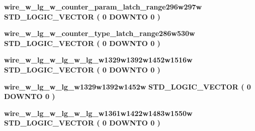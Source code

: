 \begin{DoxyCompactItemize}
{\bf wire\+\_\+w\+\_\+lg\+\_\+w\+\_\+counter\+\_\+param\+\_\+latch\+\_\+range296w297w} {\bfseries \textcolor{comment}{S\+T\+D\+\_\+\+L\+O\+G\+I\+C\+\_\+\+V\+E\+C\+T\+OR}\textcolor{vhdlchar}{ }\textcolor{vhdlchar}{(}\textcolor{vhdlchar}{ }\textcolor{vhdlchar}{ } \textcolor{vhdldigit}{0} \textcolor{vhdlchar}{ }\textcolor{keywordflow}{D\+O\+W\+N\+TO}\textcolor{vhdlchar}{ }\textcolor{vhdlchar}{ } \textcolor{vhdldigit}{0} \textcolor{vhdlchar}{ }\textcolor{vhdlchar}{)}\textcolor{vhdlchar}{ }} 
\item 
{\bf wire\+\_\+w\+\_\+lg\+\_\+w\+\_\+counter\+\_\+type\+\_\+latch\+\_\+range286w530w} {\bfseries \textcolor{comment}{S\+T\+D\+\_\+\+L\+O\+G\+I\+C\+\_\+\+V\+E\+C\+T\+OR}\textcolor{vhdlchar}{ }\textcolor{vhdlchar}{(}\textcolor{vhdlchar}{ }\textcolor{vhdlchar}{ } \textcolor{vhdldigit}{0} \textcolor{vhdlchar}{ }\textcolor{keywordflow}{D\+O\+W\+N\+TO}\textcolor{vhdlchar}{ }\textcolor{vhdlchar}{ } \textcolor{vhdldigit}{0} \textcolor{vhdlchar}{ }\textcolor{vhdlchar}{)}\textcolor{vhdlchar}{ }} 
\item 
{\bf wire\+\_\+w\+\_\+lg\+\_\+w\+\_\+lg\+\_\+w\+\_\+lg\+\_\+w1329w1392w1452w1516w} {\bfseries \textcolor{comment}{S\+T\+D\+\_\+\+L\+O\+G\+I\+C\+\_\+\+V\+E\+C\+T\+OR}\textcolor{vhdlchar}{ }\textcolor{vhdlchar}{(}\textcolor{vhdlchar}{ }\textcolor{vhdlchar}{ } \textcolor{vhdldigit}{0} \textcolor{vhdlchar}{ }\textcolor{keywordflow}{D\+O\+W\+N\+TO}\textcolor{vhdlchar}{ }\textcolor{vhdlchar}{ } \textcolor{vhdldigit}{0} \textcolor{vhdlchar}{ }\textcolor{vhdlchar}{)}\textcolor{vhdlchar}{ }} 
\item 
{\bf wire\+\_\+w\+\_\+lg\+\_\+w\+\_\+lg\+\_\+w1329w1392w1452w} {\bfseries \textcolor{comment}{S\+T\+D\+\_\+\+L\+O\+G\+I\+C\+\_\+\+V\+E\+C\+T\+OR}\textcolor{vhdlchar}{ }\textcolor{vhdlchar}{(}\textcolor{vhdlchar}{ }\textcolor{vhdlchar}{ } \textcolor{vhdldigit}{0} \textcolor{vhdlchar}{ }\textcolor{keywordflow}{D\+O\+W\+N\+TO}\textcolor{vhdlchar}{ }\textcolor{vhdlchar}{ } \textcolor{vhdldigit}{0} \textcolor{vhdlchar}{ }\textcolor{vhdlchar}{)}\textcolor{vhdlchar}{ }} 
\item 
{\bf wire\+\_\+w\+\_\+lg\+\_\+w\+\_\+lg\+\_\+w\+\_\+lg\+\_\+w1361w1422w1483w1550w} {\bfseries \textcolor{comment}{S\+T\+D\+\_\+\+L\+O\+G\+I\+C\+\_\+\+V\+E\+C\+T\+OR}\textcolor{vhdlchar}{ }\textcolor{vhdlchar}{(}\textcolor{vhdlchar}{ }\textcolor{vhdlchar}{ } \textcolor{vhdldigit}{0} \textcolor{vhdlchar}{ }\textcolor{keywordflow}{D\+O\+W\+N\+TO}\textcolor{vhdlchar}{ }\textcolor{vhdlchar}{ } \textcolor{vhdldigit}{0} \textcolor{vhdlchar}{ }\textcolor{vhdlchar}{)}\textcolor{vhdlchar}{ }} 

\end{DoxyCompactItemize}
